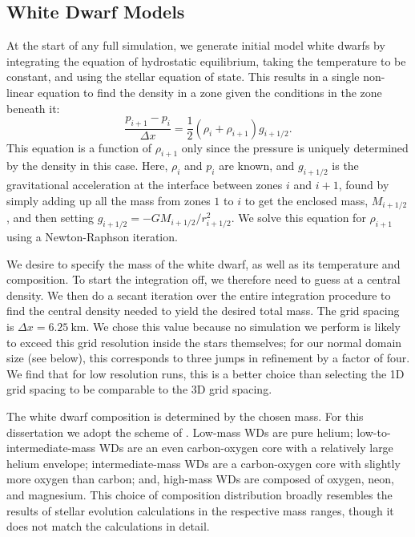 \documentclass[12pt]{article}
\begin{document}
\subsection{White Dwarf Models}
\label{sec:initial_models}

At the start of any full simulation, we generate initial model white
dwarfs by integrating the equation of hydrostatic equilibrium, taking
the temperature to be constant, and using the
stellar equation of state.  This results in a single non-linear
equation to find the density in a zone given the conditions in the
zone beneath it:
\begin{equation}
\frac{p_{i+1} - p_i}{\Delta x} = \frac{1}{2} (\rho_i + \rho_{i+1}) g_{i+1/2}.
\end{equation}
This equation is a function of $\rho_{i+1}$ only since the pressure is
uniquely determined by the density in this case. Here, $\rho_i$ and $p_i$
are known, and $g_{i+1/2}$ is the gravitational acceleration at the
interface between zones $i$ and $i+1$, found by simply adding up all
the mass from zones $1$ to $i$ to get the enclosed mass,
$M_{i+1/2}$, and then setting $g_{i+1/2} =
-GM_{i+1/2}/r_{i+1/2}^2$. We solve this equation for $\rho_{i+1}$
using a Newton-Raphson iteration.

We desire to specify the mass of the white dwarf, as well as its
temperature and composition. To start the integration off, we
therefore need to guess at a central density.  We then do a secant
iteration over the entire integration procedure to find the central
density needed to yield the desired total mass.  The grid spacing is
$\Delta x = 6.25\ \text{km}$. We chose this value because no simulation
we perform is likely to exceed this grid resolution inside the stars 
themselves; for our normal domain size (see below), this corresponds to 
three jumps in refinement by a factor of four. We find that for low 
resolution runs, this is a better choice than selecting the 1D grid 
spacing to be comparable to the 3D grid spacing.

The white dwarf composition is determined by the chosen mass. For 
this dissertation we adopt the scheme of \cite{dan:2012}. Low-mass WDs 
are pure helium; low-to-intermediate-mass WDs are an even carbon-oxygen 
core with a relatively large helium envelope; intermediate-mass 
WDs are a carbon-oxygen core with slightly more oxygen than carbon; 
and, high-mass WDs are composed of oxygen, neon, and magnesium. 
This choice of composition distribution broadly resembles the 
results of stellar evolution calculations in the respective 
mass ranges, though it does not match the calculations in detail.
\end{document}

